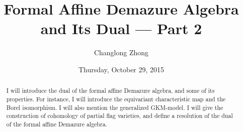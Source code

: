 \documentclass{UAmathtalk}
\author{Changlong Zhong}
\title{Formal Affine Demazure Algebra\\ and Its Dual --- Part 2}
\date{Thursday, October 29, 2015}
\begin{document}
\maketitle

\begin{abstract}
I will introduce the dual of the formal affine Demazure algebra, and some of its properties.
For instance, I will introduce the equivariant characteristic map and the Borel isomorphism.
I will also mention the generalized GKM-model.
I will give the construction of cohomology of partial flag varieties, and define a resolution of the dual of the formal affine Demazure algebra.
\end{abstract}
\end{document}
